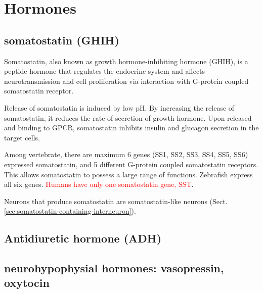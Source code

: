 \section{Hormones}
\label{sec:hormones}

\subsection{somatostatin (GHIH)}
\label{sec:somatostatin}
\label{sec:GHIH}

Somatostatin, also known as growth hormone-inhibiting hormone (GHIH), is a
peptide hormone that regulates the endocrine system and affects
neurotransmission and cell proliferation via interaction with
G-protein coupled somatostatin receptor.

Release of somatostatin is induced by low pH.
By increasing the release of somatostatin, it reduces the rate of secretion of
growth hormone. Upon released and binding to GPCR, somatostatin inhibits insulin
and glucagon secretion in the target cells.

Among vertebrate, there are maximum 6 genes (SS1, SS2, SS3, SS4, SS5, SS6)
expressed somatostatin, and 5 different G-protein coupled somatostatin
receptors. This allows somatostatin to possess a large range of functions.
Zebrafish express all six genes. \textcolor{red}{Humans have only one
somatostatin gene, SST}.

Neurons that produce somatostatin are somatostatin-like neurons
(Sect.\ref{sec:somatostatin-containing-interneuron}).


\subsection{Antidiuretic hormone (ADH) }
\label{sec:antidiuretic-hormone}
\label{sec:ADH}

\subsection{neurohypophysial hormones: vasopressin, oxytocin}
\label{sec:hormone-neurohypophysial-hormones}
\label{sec:vasopressin}
\label{sec:oxytocin}

